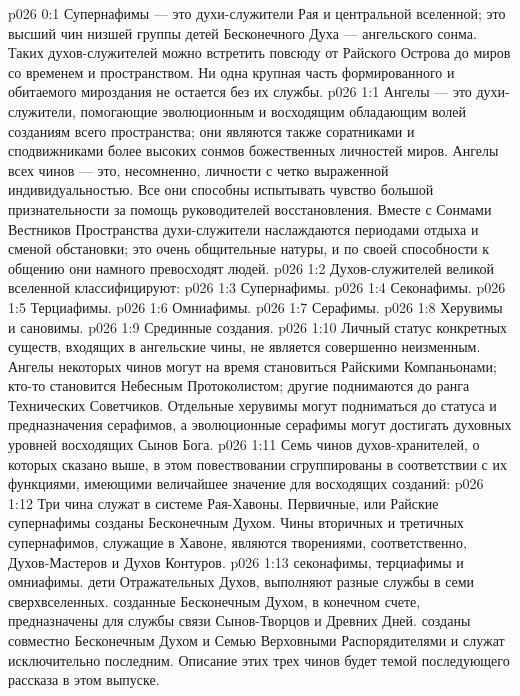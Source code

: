 \author{Совершенствователь Мудрости}
\vs p026 0:1 Супернафимы --- это духи\hyp{}служители Рая и центральной вселенной; это высший чин низшей группы детей Бесконечного Духа --- ангельского сонма. Таких духов\hyp{}служителей можно встретить повсюду от Райского Острова до миров со временем и пространством. Ни одна крупная часть формированного и обитаемого мироздания не остается без их службы.
\vs p026 1:1 Ангелы --- это духи\hyp{}служители, помогающие эволюционным и восходящим обладающим волей созданиям всего пространства; они являются также соратниками и сподвижниками более высоких сонмов божественных личностей миров. Ангелы всех чинов --- это, несомненно, личности с четко выраженной индивидуальностью. Все они способны испытывать чувство большой признательности за помощь руководителей восстановления. Вместе с Сонмами Вестников Пространства духи\hyp{}служители наслаждаются периодами отдыха и сменой обстановки; это очень общительные натуры, и по своей способности к общению они намного превосходят людей.
\vs p026 1:2 \pc Духов\hyp{}служителей великой вселенной классифицируют:
\vs p026 1:3 \bibnobreakspace Супернафимы.
\vs p026 1:4 \bibnobreakspace Секонафимы.
\vs p026 1:5 \bibnobreakspace Терциафимы.
\vs p026 1:6 \bibnobreakspace Омниафимы.
\vs p026 1:7 \bibnobreakspace Серафимы.
\vs p026 1:8 \bibnobreakspace Херувимы и сановимы.
\vs p026 1:9 \bibnobreakspace Срединные создания.
\vs p026 1:10 \pc Личный статус конкретных существ, входящих в ангельские чины, не является совершенно неизменным. Ангелы некоторых чинов могут на время становиться Райскими Компаньонами; кто\hyp{}то становится Небесным Протоколистом; другие поднимаются до ранга Технических Советчиков. Отдельные херувимы могут подниматься до статуса и предназначения серафимов, а эволюционные серафимы могут достигать духовных уровней восходящих Сынов Бога.
\vs p026 1:11 \pc Семь чинов духов\hyp{}хранителей, о которых сказано выше, в этом повествовании сгруппированы в соответствии с их функциями, имеющими величайшее значение для восходящих созданий:
\vs p026 1:12 \bibnobreakspace {} Три чина  служат в системе Рая\hyp{}Хавоны. Первичные, или Райские супернафимы созданы Бесконечным Духом. Чины вторичных и третичных супернафимов, служащие в Хавоне, являются творениями, соответственно, Духов\hyp{}Мастеров и Духов Контуров.
\vs p026 1:13 \bibnobreakspace {} секонафимы, терциафимы и омниафимы.  дети Отражательных Духов, выполняют разные службы в семи сверхвселенных.  созданные Бесконечным Духом, в конечном счете, предназначены для службы связи Сынов\hyp{}Творцов и Древних Дней.  созданы совместно Бесконечным Духом и Семью Верховными Распорядителями и служат исключительно последним. Описание этих трех чинов будет темой последующего рассказа в этом выпуске.
